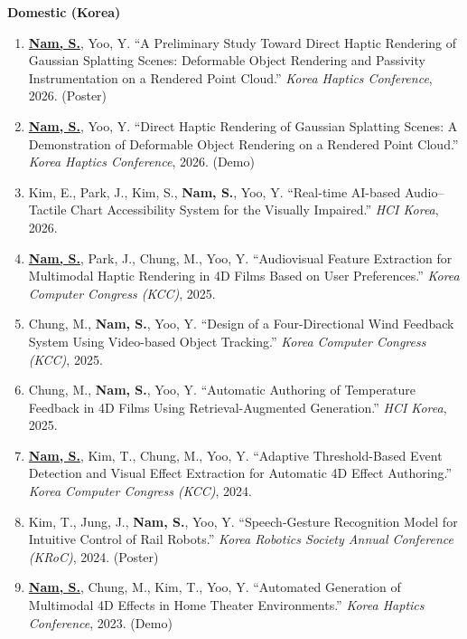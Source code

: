 \documentclass[11pt,a4paper]{article}
\newcommand{\me}{\textbf{Nam, S.}}
\begin{document}
\textbf{Domestic (Korea)}
\begin{enumerate}[leftmargin=1.5em, itemsep=3pt, topsep=3pt]
  \item \underline{\me}, Yoo, Y. ``A Preliminary Study Toward Direct Haptic Rendering of Gaussian Splatting Scenes: Deformable Object Rendering and Passivity Instrumentation on a Rendered Point Cloud.'' \textit{Korea Haptics Conference}, 2026. (Poster)
  \item \underline{\me}, Yoo, Y. ``Direct Haptic Rendering of Gaussian Splatting Scenes: A Demonstration of Deformable Object Rendering on a Rendered Point Cloud.'' \textit{Korea Haptics Conference}, 2026. (Demo)
  \item Kim, E., Park, J., Kim, S., \me, Yoo, Y. ``Real-time AI-based Audio--Tactile Chart Accessibility System for the Visually Impaired.'' \textit{HCI Korea}, 2026.
  \item \underline{\me}, Park, J., Chung, M., Yoo, Y. ``Audiovisual Feature Extraction for Multimodal Haptic Rendering in 4D Films Based on User Preferences.'' \textit{Korea Computer Congress (KCC)}, 2025.
  \item Chung, M., \me, Yoo, Y. ``Design of a Four-Directional Wind Feedback System Using Video-based Object Tracking.'' \textit{Korea Computer Congress (KCC)}, 2025.
  \item Chung, M., \me, Yoo, Y. ``Automatic Authoring of Temperature Feedback in 4D Films Using Retrieval-Augmented Generation.'' \textit{HCI Korea}, 2025.
  \item \underline{\me}, Kim, T., Chung, M., Yoo, Y. ``Adaptive Threshold-Based Event Detection and Visual Effect Extraction for Automatic 4D Effect Authoring.'' \textit{Korea Computer Congress (KCC)}, 2024.
  \item Kim, T., Jung, J., \me, Yoo, Y. ``Speech-Gesture Recognition Model for Intuitive Control of Rail Robots.'' \textit{Korea Robotics Society Annual Conference (KRoC)}, 2024. (Poster)
  \item \underline{\me}, Chung, M., Kim, T., Yoo, Y. ``Automated Generation of Multimodal 4D Effects in Home Theater Environments.'' \textit{Korea Haptics Conference}, 2023. (Demo)
\end{enumerate}

\end{document}
